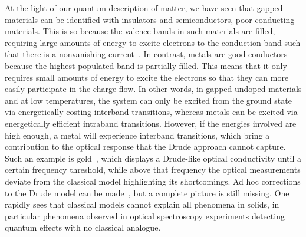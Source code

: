 At the light of our quantum description of matter, we have seen that gapped materials can be identified with insulators and semiconductors, poor conducting materials.
This is so because the valence bands in such materials are filled, requiring large amounts of energy to excite electrons to the conduction band such that there is a nonvanishing current~\cite{Kittel_2004,Simon_Oxford_2013}.
In contrast, metals are good conductors because the highest populated band is partially filled.
This means that it only requires small amounts of energy to excite the electrons so that they can more easily participate in the charge flow.
In other words, in gapped undoped materials and at low temperatures, the system can only be excited from the ground state via energetically costing interband transitions, whereas metals can be excited via energetically efficient intraband transitions.
However, if the energies involved are high enough, a metal will experience interband transitions, which bring a contribution to the optical response that the Drude approach cannot capture.
Such an example is gold~\cite{Christy_1972}, which displays a Drude-like optical conductivity until a certain frequency threshold, while above that frequency the optical measurements deviate from the classical model highlighting its shortcomings.
Ad hoc corrections to the Drude model can be made~\cite{Meyer_2006}, but a complete picture is still missing.
One rapidly sees that classical models cannot explain all phenomena in solids, in particular phenomena observed in optical spectroscopy experiments detecting quantum effects with no classical analogue.

